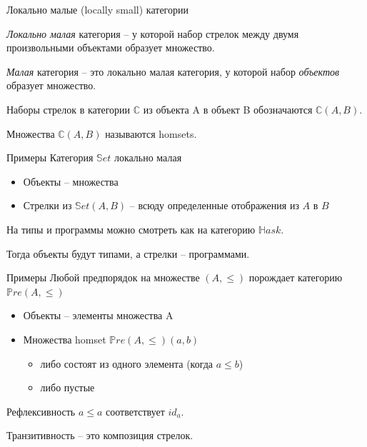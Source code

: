 \documentclass[
  russian,
  aspectratio=169,
  xcolor={svgnames},
  hyperref={colorlinks,citecolor=DeepPink4}]{beamer}
\begin{document}
\begin{frame}[fragile]{Локально малые (locally small) категории}
\begin{definition}
\emph{Локально малая} категория -- у которой набор стрелок между двумя произвольными объектами образует множество.
\end{definition}
\begin{definition}
\emph{Малая} категория -- это локально малая категория, у которой набор \emph{объектов} образует множество.
\end{definition}
\vspace{1cm}
Наборы стрелок в категории $\mathbb{C}$ из объекта A в объект B обозначаются $\mathbb{C}(A, B)$.

Множества $\mathbb{C}(A, B)$ называются homsets.
\end{frame}

\begin{frame}[fragile]{Примеры}
Категория $\mathbb{S}et$ локально малая
\begin{itemize}
 \item Объекты -- множества
 \item Стрелки из $\mathbb{S}et(A,B)$ -- всюду определенные отображения из $A$ в $B$
\end{itemize}
\vspace{1cm}

На типы и программы можно смотреть как на категорию $\mathbb{H}ask$.

Тогда объекты будут типами, а стрелки -- программами.
\end{frame}

\begin{frame}[fragile]{Примеры}
Любой предпорядок на множестве $(A,\leqslant)$ порождает категорию  $\mathbb{P}re(A,\leqslant)$

\begin{itemize}
 \item Объекты -- элементы множества A
 \item Множества homset $\mathbb{P}re(A,\leqslant)(a,b)$
    \begin{itemize}
    \item либо состоят из одного элемента (когда $a\leqslant b$)
    \item либо пустые
    \end{itemize}
\end{itemize}
\vspace{1cm}
Рефлексивность $a\leqslant a$ соответствует $id_a$.

Транзитивность -- это композиция стрелок.
\end{frame}
\end{document}
